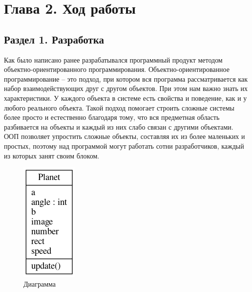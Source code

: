 \documentclass[14pt, oneside]{altsu-report}
\begin{document}
\chapter{Глава 2. Ход работы}
\section{Раздел 1. Разработка}
Как было написано ранее разрабатывался программный продукт методом объектно-ориентированного программирования. Объектно-ориентированное программирование – это подход, при котором вся программа рассматривается как набор взаимодействующих друг с другом объектов. При этом нам важно знать их характеристики. У каждого объекта в системе есть свойства и поведение, как и у любого реального объекта. Такой подход помогает строить сложные системы более просто и естественно благодаря тому, что вся предметная область разбивается на объекты и каждый из них слабо связан с другими объектами. ООП позволяет упростить сложные объекты, составляя их из более маленьких и простых, поэтому над программой могут работать сотни разработчиков, каждый из которых занят своим блоком.

\begin{figure}[H]
\begin{center}
\includegraphics{uml} 
\caption{Диаграмма}
\end{center}
\end{figure}
\end{document}
